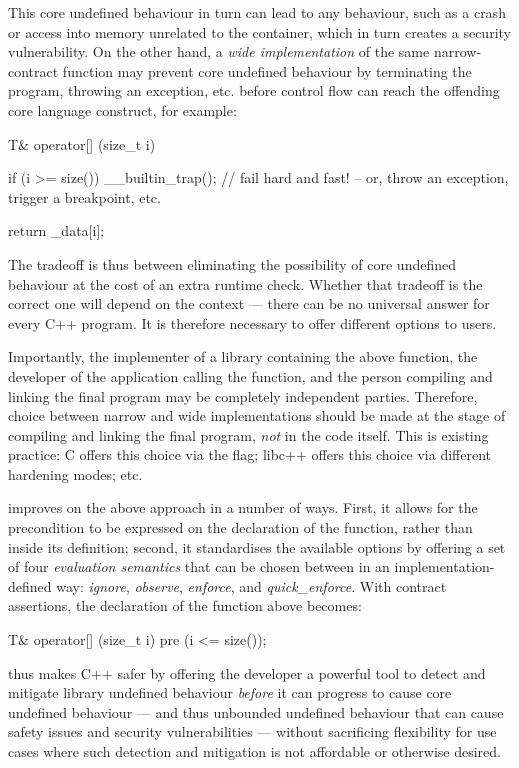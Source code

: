 This core undefined behaviour in turn can lead to any behaviour, such as a crash or access into memory unrelated to the container, which in turn creates a security vulnerability. On the other hand, a \emph{wide implementation} of the same narrow-contract function may prevent core undefined behaviour by terminating the program, throwing an exception, etc. before control flow can reach the offending core language construct, for example:
\begin{codeblock}
T& operator[] (size_t i) {
  if (i >= size())
    __builtin_trap(); // fail hard and fast! -- or, throw an exception, trigger a breakpoint, etc.
    
  return _data[i];
}
\end{codeblock}
The tradeoff is thus between eliminating the possibility of core undefined behaviour at the cost of an extra runtime check. Whether that tradeoff is the correct one will depend on the context --- there can be no universal answer for every C++ program. It is therefore necessary to offer different options to users.

Importantly, the implementer of a library containing the above function, the developer of the application calling the function, and the person compiling and linking the final program may be completely independent parties. Therefore, choice between narrow and wide implementations should be made at the stage of compiling and linking the final program, \emph{not} in the code itself. This is existing practice: C  offers this choice via the  flag; libc++ offers this choice via different hardening modes; etc.

\cite{P2900R9} improves on the above approach in a number of ways. First, it allows for the precondition to be expressed on the declaration of the function, rather than inside its definition; second, it standardises the available options by offering a set of four \emph{evaluation semantics} that can be chosen between in an implementation-defined way: \emph{ignore}, \emph{observe}, \emph{enforce}, and \emph{quick_enforce}. With \cite{P2900R9} contract assertions, the declaration of the function above becomes:
\begin{codeblock}
T& operator[] (size_t i)
pre (i <= size());
\end{codeblock}
\cite{P2900R9} thus makes C++ safer by offering the developer a powerful tool to detect and mitigate library undefined behaviour \emph{before} it can progress to cause core undefined behaviour --- and thus unbounded undefined behaviour that can cause safety issues and security vulnerabilities --- without sacrificing flexibility for use cases where such detection and mitigation is not affordable or otherwise desired.


